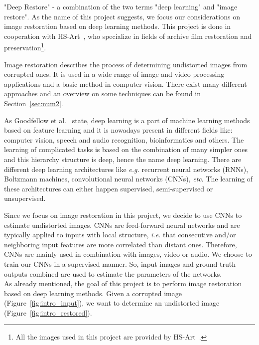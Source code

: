 "Deep Restore" - a combination of the two terms "deep learning" and "image restore". As the name of this project suggests, we focus our considerations on image restoration based on deep learning methods. This project is done in cooperation with HS-Art~\cite{hs-art}, who specialize in fields of archive film restoration and preservation\footnote{All the images used in this project are provided by HS-Art~\cite{hs-art}.}.


Image restoration describes the process of determining undistorted images from corrupted ones. It is used in a wide range of image and video processing applications and a basic method in computer vision. There exist many different approaches and an overview on some techniques can be found in Section~\ref{sec:num2}.

As Goodfellow et al.~\cite{Goodfellow16} state, deep learning is a part of machine learning methods based on feature learning and it is nowadays present in different fields like: computer vision, speech and audio recognition, bioinformatics and others. The learning of complicated tasks is based on the combination of many simpler ones and this hierarchy structure is deep, hence the name deep learning. There are different deep learning architectures like \textit{e.g.} recurrent neural networks (RNNs), Boltzmann machines, convolutional neural networks (CNNs), \textit{etc}. The learning of these architectures can either happen supervised, semi-supervised or unsupervised.

Since we focus on image restoration in this project, we decide to use CNNs to estimate undistorted images.  CNNs are feed-forward neural networks and are typically applied to inputs with local structure, \textit{i.e.} that consecutive and/or neighboring input features are more correlated than distant ones. Therefore, CNNs are mainly used in combination with images, video or audio. We choose to train our CNNs in a supervised manner. So, input images and ground-truth outputs combined are used to estimate the parameters of the networks.\\

As already mentioned, the goal of this project is to perform image restoration based on deep learning methods. Given a corrupted image (Figure~\ref{fig:intro_input}), we want to determine an undistorted image (Figure~\ref{fig:intro_restored}). 

